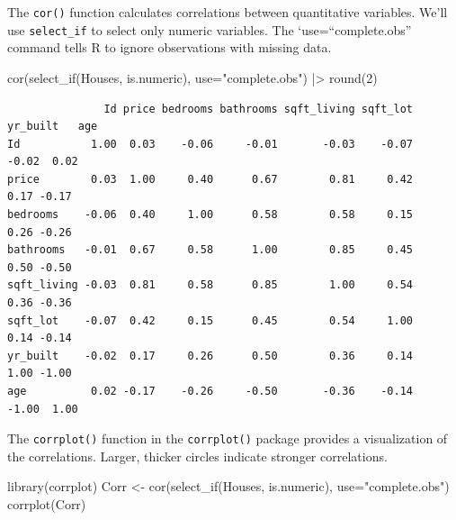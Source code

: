 \documentclass[
  letterpaper,
  DIV=11,
  numbers=noendperiod]{scrreprt}
\newenvironment{Shaded}{\begin{snugshade}}{\end{snugshade}}
\newcommand{\AttributeTok}[1]{\textcolor[rgb]{0.40,0.45,0.13}{#1}}
\newcommand{\DecValTok}[1]{\textcolor[rgb]{0.68,0.00,0.00}{#1}}
\newcommand{\FunctionTok}[1]{\textcolor[rgb]{0.28,0.35,0.67}{#1}}
\newcommand{\NormalTok}[1]{\textcolor[rgb]{0.00,0.23,0.31}{#1}}
\newcommand{\OtherTok}[1]{\textcolor[rgb]{0.00,0.23,0.31}{#1}}
\newcommand{\SpecialCharTok}[1]{\textcolor[rgb]{0.37,0.37,0.37}{#1}}
\newcommand{\StringTok}[1]{\textcolor[rgb]{0.13,0.47,0.30}{#1}}
\begin{document}
The \texttt{cor()} function calculates correlations between quantitative
variables. We'll use \texttt{select\_if} to select only numeric
variables. The `use=``complete.obs'' command tells R to ignore
observations with missing data.

\begin{Shaded}
\begin{Highlighting}[]
\FunctionTok{cor}\NormalTok{(}\FunctionTok{select\_if}\NormalTok{(Houses, is.numeric), }\AttributeTok{use=}\StringTok{"complete.obs"}\NormalTok{) }\SpecialCharTok{|\textgreater{}} \FunctionTok{round}\NormalTok{(}\DecValTok{2}\NormalTok{)}
\end{Highlighting}
\end{Shaded}

\begin{verbatim}
               Id price bedrooms bathrooms sqft_living sqft_lot yr_built   age
Id           1.00  0.03    -0.06     -0.01       -0.03    -0.07    -0.02  0.02
price        0.03  1.00     0.40      0.67        0.81     0.42     0.17 -0.17
bedrooms    -0.06  0.40     1.00      0.58        0.58     0.15     0.26 -0.26
bathrooms   -0.01  0.67     0.58      1.00        0.85     0.45     0.50 -0.50
sqft_living -0.03  0.81     0.58      0.85        1.00     0.54     0.36 -0.36
sqft_lot    -0.07  0.42     0.15      0.45        0.54     1.00     0.14 -0.14
yr_built    -0.02  0.17     0.26      0.50        0.36     0.14     1.00 -1.00
age          0.02 -0.17    -0.26     -0.50       -0.36    -0.14    -1.00  1.00
\end{verbatim}

The \texttt{corrplot()} function in the \texttt{corrplot()} package
provides a visualization of the correlations. Larger, thicker circles
indicate stronger correlations.

\begin{Shaded}
\begin{Highlighting}[]
\FunctionTok{library}\NormalTok{(corrplot)}
\NormalTok{Corr }\OtherTok{\textless{}{-}} \FunctionTok{cor}\NormalTok{(}\FunctionTok{select\_if}\NormalTok{(Houses, is.numeric), }\AttributeTok{use=}\StringTok{"complete.obs"}\NormalTok{)}
\FunctionTok{corrplot}\NormalTok{(Corr)}
\end{Highlighting}
\end{Shaded}
\end{document}
